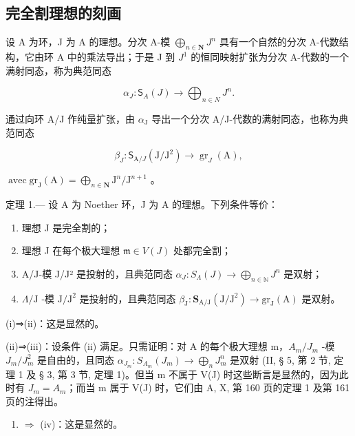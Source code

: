\subsection{完全割理想的刻画}

设 A 为环，J 为 A 的理想。分次 A-模 \(\bigoplus_{n\in\mathbf{N}}J^{n}\) 具有一个自然的分次 A-代数结构，它由环 A 中的乘法导出；于是 J 到 \(J^{1}\) 的恒同映射扩张为分次 A-代数的一个满射同态，称为典范同态

\[
\alpha_ {J}: \mathsf {S} _ {A} (J) \longrightarrow \bigoplus_ {n \in N} J ^ {n}.
\]

通过向环 A/J 作纯量扩张，由 \(\alpha_{\mathrm{J}}\) 导出一个分次 A/J-代数的满射同态，也称为典范同态

\[
\beta_ {J}: \mathsf {S} _ {\mathrm{A} / J} (\mathrm{J} / \mathrm{J} ^ {2}) \longrightarrow \operatorname{gr} _ {J} (\mathrm{A}),
\]

\(\operatorname{avec} \mathrm{gr}_{\mathrm{J}}(\mathrm{A}) = \bigoplus_{n \in \mathbf{N}} \mathrm{J}^n / \mathrm{J}^{n+1}\) 。

定理 1.--- 设 A 为 Noether 环，J 为 A 的理想。下列条件等价：

\begin{enumerate}
\def\labelenumi{(\roman{enumi})}
\item
  理想 J 是完全割的；
\item
  理想 J 在每个极大理想 \(\mathfrak{m} \in V(J)\) 处都完全割；
\item
  A/J-模 J/J² 是投射的，且典范同态 \(\alpha_{J}: S_{\Lambda}(J) \longrightarrow \bigoplus_{n \in \mathbb{N}} J^{n}\) 是双射；
\item
  \(\Lambda/\mathrm{J}\) -模 \(\mathrm{J}/\mathrm{J}^2\) 是投射的，且典范同态 \(\beta_{\mathrm{J}}:\mathbf{S}_{\mathrm{A}/\mathrm{J}}(\mathrm{J}/\mathrm{J}^2)\longrightarrow\mathrm{gr}_{\mathrm{J}}(\mathrm{A})\) 是双射。
\end{enumerate}

(i)⇒(ii)：这是显然的。

(ii)⇒(iii)：设条件 (ii) 满足。只需证明：对 A 的每个极大理想 m，\(A_{m}/J_{m}\) -模 \(J_{m}/J_{m}^{2}\) 是自由的，且同态 \(\alpha_{J_{m}}: S_{A_{m}}(J_{m}) \longrightarrow \bigoplus_{n} J_{m}^{n}\) 是双射 (II, § 5, 第 2 节, 定理 1 及 § 3, 第 3 节, 定理 1)。但当 m 不属于 V(J) 时这些断言是显然的，因为此时有 \(J_{m} = A_{m}\)；而当 m 属于 V(J) 时，它们由 A, X, 第 160 页的定理 1 及第 161 页的注得出。

\begin{enumerate}
\def\labelenumi{(\roman{enumi})}
\setcounter{enumi}{2}
\tightlist
\item
  \(\Rightarrow\) (iv)：这是显然的。
\end{enumerate}

